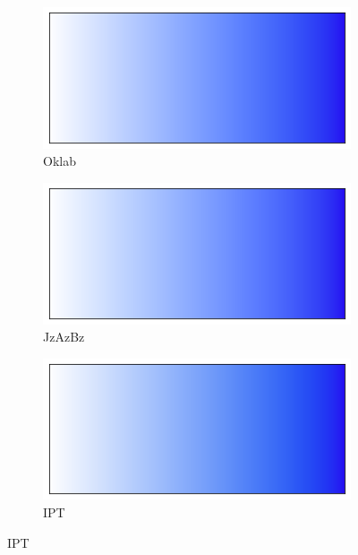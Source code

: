\documentclass[12pt, a4paper, ngerman]{article}
\begin{document}
\begin{figure}
  \centering
  \begin{subfigure}[b]{0.3\linewidth}
    \includegraphics[width=\linewidth]{Grafiken/Vergleich_Farbverlauf/oklab_blend.png}
    \caption{Oklab}
    \label{fig:blend_oklab}
  \end{subfigure}
  \begin{subfigure}[b]{0.3\linewidth}
    \includegraphics[width=\linewidth]{Grafiken/Vergleich_Farbverlauf/jzazbz_blend.png}
    \caption{JzAzBz}
    \label{fig:blend_jzazbz}
  \end{subfigure}
  \begin{subfigure}[b]{0.3\linewidth}
    \includegraphics[width=\linewidth]{Grafiken/Vergleich_Farbverlauf/ipt_blend.png}
    \caption{IPT}
    \label{fig:blend_ipt}
  \end{subfigure}
  

\end{figure}
\end{document}
